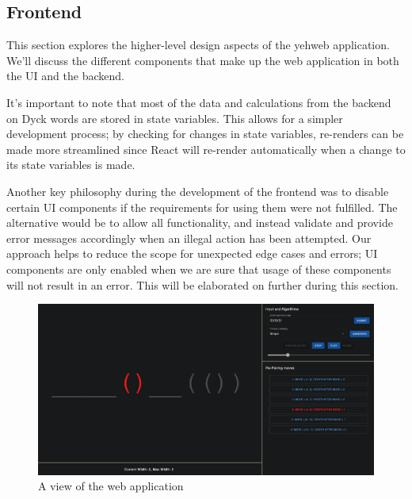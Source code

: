 \subsection{Frontend}
This section explores the higher-level design aspects of the yehweb application. We'll discuss the different components that make up the web application in both the UI and the backend.

It's important to note that most of the data and calculations from the backend on Dyck words are stored in state variables. This allows for a simpler development process; by checking for changes in state variables, re-renders can be made more streamlined since React will re-render automatically when a change to its state variables is made.


Another key philosophy during the development of the frontend was to disable certain UI components if the requirements for using them were not fulfilled. The alternative would be to allow all functionality, and instead validate and provide error messages accordingly when an illegal action has been attempted. Our approach helps to reduce the scope for unexpected edge cases and errors; UI components are only enabled when we are sure that usage of these components will not result in an error. This will be elaborated on further during this section.

\begin{figure}[H]
    \centering
    \includegraphics[scale = 0.195]{./images/webApp.png}
    \caption{A view of the web application}
\end{figure}

